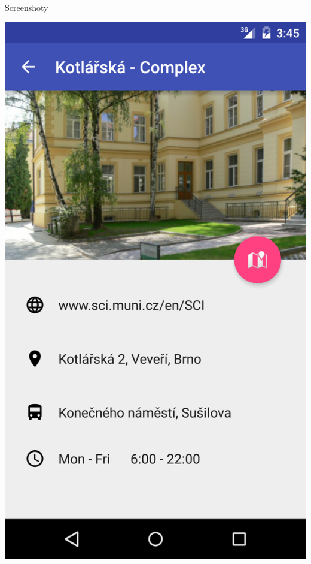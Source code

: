 \documentclass[pdf]{beamer}
\begin{document}
\begin{frame}{Screenshoty}
  \begin{center}
    \includegraphics[scale=0.1]{app-detail}
    \hspace{10px}

\end{center}
\end{frame}
\end{document}

